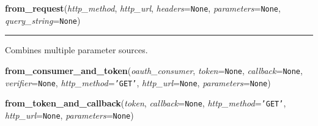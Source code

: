     \label{lib:oauth:OAuthRequest:from_request}

    \vspace{0.5ex}

\hspace{.8\funcindent}\begin{boxedminipage}{\funcwidth}

    \raggedright \textbf{from\_request}(\textit{http\_method}, \textit{http\_url}, \textit{headers}={\tt None}, \textit{parameters}={\tt None}, \textit{query\_string}={\tt None})

    \vspace{-1.5ex}

    \rule{\textwidth}{0.5\fboxrule}
\setlength{\parskip}{2ex}
    Combines multiple parameter sources.

\setlength{\parskip}{1ex}
    \end{boxedminipage}

    \label{lib:oauth:OAuthRequest:from_consumer_and_token}

    \vspace{0.5ex}

\hspace{.8\funcindent}\begin{boxedminipage}{\funcwidth}

    \raggedright \textbf{from\_consumer\_and\_token}(\textit{oauth\_consumer}, \textit{token}={\tt None}, \textit{callback}={\tt None}, \textit{verifier}={\tt None}, \textit{http\_method}={\tt \texttt{'}\texttt{GET}\texttt{'}}, \textit{http\_url}={\tt None}, \textit{parameters}={\tt None})

\setlength{\parskip}{2ex}
\setlength{\parskip}{1ex}
    \end{boxedminipage}

    \label{lib:oauth:OAuthRequest:from_token_and_callback}

    \vspace{0.5ex}

\hspace{.8\funcindent}\begin{boxedminipage}{\funcwidth}

    \raggedright \textbf{from\_token\_and\_callback}(\textit{token}, \textit{callback}={\tt None}, \textit{http\_method}={\tt \texttt{'}\texttt{GET}\texttt{'}}, \textit{http\_url}={\tt None}, \textit{parameters}={\tt None})

\setlength{\parskip}{2ex}
\setlength{\parskip}{1ex}
    \end{boxedminipage}


